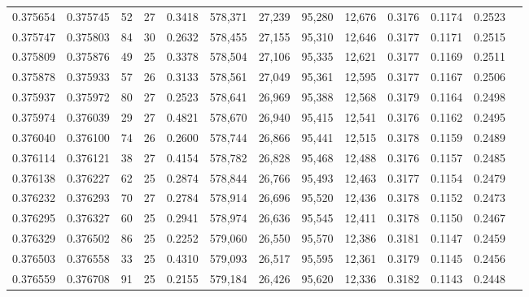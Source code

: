 \begin{tabular}{rrrrrrrrrrrrr}
0.375654 & 0.375745 &    52 &  27 &                                     0.3418 & 578,371 &  27,239 &  95,280 &  12,676 & 0.3176 & 0.1174 & 0.2523 \\
0.375747 & 0.375803 &    84 &  30 &                                     0.2632 & 578,455 &  27,155 &  95,310 &  12,646 & 0.3177 & 0.1171 & 0.2515 \\
0.375809 & 0.375876 &    49 &  25 &                                     0.3378 & 578,504 &  27,106 &  95,335 &  12,621 & 0.3177 & 0.1169 & 0.2511 \\
0.375878 & 0.375933 &    57 &  26 &                                     0.3133 & 578,561 &  27,049 &  95,361 &  12,595 & 0.3177 & 0.1167 & 0.2506 \\
0.375937 & 0.375972 &    80 &  27 &                                     0.2523 & 578,641 &  26,969 &  95,388 &  12,568 & 0.3179 & 0.1164 & 0.2498 \\
0.375974 & 0.376039 &    29 &  27 &                                     0.4821 & 578,670 &  26,940 &  95,415 &  12,541 & 0.3176 & 0.1162 & 0.2495 \\
0.376040 & 0.376100 &    74 &  26 &                                     0.2600 & 578,744 &  26,866 &  95,441 &  12,515 & 0.3178 & 0.1159 & 0.2489 \\
0.376114 & 0.376121 &    38 &  27 &                                     0.4154 & 578,782 &  26,828 &  95,468 &  12,488 & 0.3176 & 0.1157 & 0.2485 \\
0.376138 & 0.376227 &    62 &  25 &                                     0.2874 & 578,844 &  26,766 &  95,493 &  12,463 & 0.3177 & 0.1154 & 0.2479 \\
0.376232 & 0.376293 &    70 &  27 &                                     0.2784 & 578,914 &  26,696 &  95,520 &  12,436 & 0.3178 & 0.1152 & 0.2473 \\
0.376295 & 0.376327 &    60 &  25 &                                     0.2941 & 578,974 &  26,636 &  95,545 &  12,411 & 0.3178 & 0.1150 & 0.2467 \\
0.376329 & 0.376502 &    86 &  25 &                                     0.2252 & 579,060 &  26,550 &  95,570 &  12,386 & 0.3181 & 0.1147 & 0.2459 \\
0.376503 & 0.376558 &    33 &  25 &                                     0.4310 & 579,093 &  26,517 &  95,595 &  12,361 & 0.3179 & 0.1145 & 0.2456 \\
0.376559 & 0.376708 &    91 &  25 &                                     0.2155 & 579,184 &  26,426 &  95,620 &  12,336 & 0.3182 & 0.1143 & 0.2448 \\

\end{tabular}
